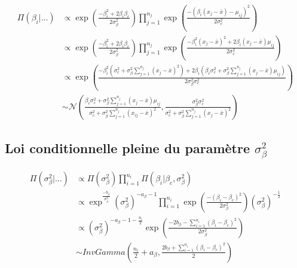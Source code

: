 \documentclass[
]{article}
\begin{document}
\begin{align*}
\Pi(\beta_{i}|...)&\propto \exp\left(\frac{-\beta_i^2+2\beta_i\beta_c}{2\sigma_{\beta}^{2}}\right) \prod_{j=1}^{n_{j}} \exp\left(\frac{-(\beta_{i}(x_{j}-\bar{x})-\mu_{ij})^{2}}{2\sigma_{c}^{2}}\right)  \\
        &\propto \exp\left(\frac{-\beta_i^2+2\beta_i\beta_c}{2\sigma_{\beta}^{2}}\right) \prod_{j=1}^{n_{j}} \exp\left(\frac{-\beta_i^2(x_{j}-\bar{x})^2+2\beta_i(x_{j}-\bar{x})\mu_{ij}}{2\sigma_{c}^{2}}\right)  \\
        &\propto \exp\left(\frac{-\beta_i^2(\sigma_c^2+\sigma_{\beta}^2\sum\limits_{j=1}^{n_j}(x_{j}-\bar{x})^2) +2\beta_i(\beta_c\sigma_c^2+\sigma_{\beta}^2\sum\limits_{j=1}^{n_j} (x_{j}-\bar{x})\mu_{ij})}{2\sigma_{\beta}^{2}\sigma_c^2}\right)\\
        &\sim \mathcal{N}\left(\frac{\beta_c\sigma_c^2+\sigma_{\beta}^2\sum\limits_{j=1}^{n_j} (x_{j}-\bar{x})\mu_{ij}}{\sigma_c^2+\sigma_{\beta}^2\sum\limits_{j=1}^{n_j}(x_{ij}-\bar{x})^2},\frac{\sigma_{\beta}^{2}\sigma_c^2}{\sigma_c^2+\sigma_{\beta}^2\sum\limits_{j=1}^{n_j}(x_{j}-\bar{x})^2}\right)
\end{align*}

\hypertarget{loi-conditionnelle-pleine-du-paramuxe8tre-sigma_beta2}{%
\subsection{\texorpdfstring{Loi conditionnelle pleine du paramètre
\(\sigma_{\beta}^2\)}{Loi conditionnelle pleine du paramètre \textbackslash sigma\_\{\textbackslash beta\}\^{}2}}\label{loi-conditionnelle-pleine-du-paramuxe8tre-sigma_beta2}}

\begin{align*}
\Pi(\sigma_{\beta}^{2}|...) &\propto \Pi(\sigma_{\beta}^{2}) \prod_{i=1}^{n_{i}}\Pi(\beta_{i}|\beta_{c},\sigma_{\beta}^{2}) \\
&\propto \exp^{\frac{-b_{\beta}}{\sigma_{\beta}^{2}}}(\sigma_{\beta}^{2})^{-a_{\beta}-1}\prod_{i=1}^{n_{i}} \exp\left(\frac{-(\beta_{i}-\beta_{c})^{2}}{2\sigma_{\beta}^{2}}\right)(\sigma_{\beta}^{2})^{-\frac{1}{2}}\\
&\propto (\sigma_{\beta}^{2})^{-a_{\beta}-1-\frac{n_{i}}{2}}\exp\left(\frac{-2b_{\beta}-\sum\limits_{i=1}^{n_{i}}(\beta_{i}-\beta_{c})^{2}}{2\sigma_{\beta}^{2}}\right)\\
&\sim InvGamma(\frac{n_{i}}{2}+a_{\beta},\frac{2b_{\beta}+\sum\limits_{i=1}^{n_{i}}(\beta_{i}-\beta_{c})^{2}}{2})
\end{align*}
\end{document}
